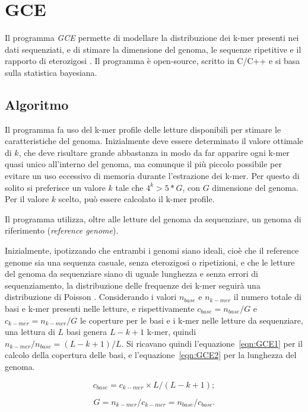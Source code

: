 \documentclass[crop=false, class=book]{standalone}
\begin{document}
	\section{GCE}
	Il programma \textit{GCE} permette di modellare la distribuzione dei k-mer presenti nei dati sequenziati, e di stimare la dimensione del genoma, le sequenze ripetitive e il rapporto di eterozigosi \cite{liu2013GCE}. Il programma è open-source, scritto in C/C++ e si basa sulla statistica bayesiana.
	
	\subsection{Algoritmo}
	Il programma fa uso del k-mer profile delle letture disponibili per stimare le caratteristiche del genoma. Inizialmente deve essere determinato il valore ottimale di $k$, che deve risultare grande abbastanza in modo da far apparire ogni k-mer quasi unico all'interno del genoma, ma comunque il più piccolo possibile per evitare un uso eccessivo di memoria durante l'estrazione dei k-mer. Per questo di solito si preferisce un valore $k$ tale che $4^k>5*G$, con $G$ dimensione del genoma. Per il valore $k$ scelto, può essere calcolato il k-mer profile.
	
	Il programma utilizza, oltre alle letture del genoma da sequenziare, un genoma di riferimento (\textit{reference genome}).
	
	Inizialmente, ipotizzando che entrambi i genomi siano ideali, cioè che il reference genome sia una sequenza casuale, senza eterozigosi o ripetizioni, e che le letture del genoma da sequenziare siano di uguale lunghezza e senza errori di sequenziamento, la distribuzione delle frequenze dei k-mer seguirà una distribuzione di Poisson \cite{li2003estimating}. Considerando i valori $n_{base}$ e $n_{k-mer}$ il numero totale di basi e k-mer presenti nelle letture, e rispettivamente $c_{base} = n_{base}/G$ e $c_{k-mer} = n_{k-mer}/G$ le coperture per le basi e i k-mer nelle letture da sequenziare, una lettura di $L$ basi genera $L-k+1$ k-mer, quindi $n_{k-mer} / n_{base} = (L-k+1)/L$. Si ricavano quindi l'equazione~\vref{eqn:GCE1} per il calcolo della copertura delle basi, e l'equazione~\vref{eqn:GCE2} per la lunghezza del genoma.
	
	\begin{equation}
		\label{eqn:GCE1}
		c_{base} = c_{k-mer} \times L / (L-k+1);
	\end{equation}

	\begin{equation}
		\label{eqn:GCE2}
		G = n_{k-mer} / c_{k-mer} = n_{base} / c_{base}.
	\end{equation}
	
\end{document}
